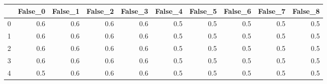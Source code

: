 \begin{tabular}{lrrrrrrrrr}
\toprule
{} &  False\_0 &  False\_1 &  False\_2 &  False\_3 &  False\_4 &  False\_5 &  False\_6 &  False\_7 &  False\_8 \\ \hline
\midrule
0 &      0.6 &      0.6 &      0.6 &      0.6 &      0.5 &      0.5 &      0.5 &      0.5 &      0.5 \\ \hline
1 &      0.6 &      0.6 &      0.6 &      0.6 &      0.5 &      0.5 &      0.5 &      0.5 &      0.5 \\ \hline
2 &      0.6 &      0.6 &      0.6 &      0.6 &      0.5 &      0.5 &      0.5 &      0.5 &      0.5 \\ \hline
3 &      0.6 &      0.6 &      0.6 &      0.6 &      0.5 &      0.5 &      0.5 &      0.5 &      0.5 \\ \hline
4 &      0.5 &      0.6 &      0.6 &      0.6 &      0.5 &      0.5 &      0.5 &      0.5 &      0.5 \\ \hline
\bottomrule
\end{tabular}
